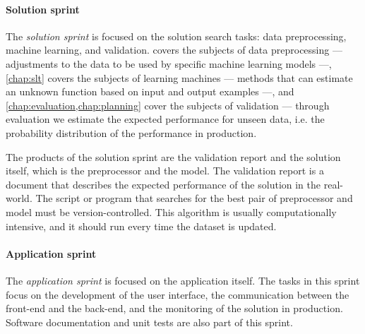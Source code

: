 \paragraph{Solution sprint}
The \emph{solution sprint} is focused on the solution search tasks: data preprocessing, machine
learning, and validation.   covers the subjects of data
preprocessing ---
adjustments to the data to be used by specific machine learning models ---, \cref{chap:slt}
covers the subjects of learning machines --- methods that can estimate an unknown function
based on input and output examples  ---, and \cref{chap:evaluation,chap:planning} cover
the subjects of validation --- through evaluation we estimate the expected performance for unseen
data, i.e. the probability distribution of the performance in production.

The products of the solution sprint are the validation report and the solution itself,
which is the preprocessor and the model.  The validation report is a document that
describes the expected performance of the solution in the real-world.  The script or
program that searches for the best pair of preprocessor and model must be
version-controlled.  This algorithm is usually computationally intensive, and it should
run every time the dataset is updated.

\paragraph{Application sprint}
The \emph{application sprint} is focused on the application itself.  The tasks in this
sprint focus on the development of the user interface, the communication between the
front-end and the back-end, and the monitoring of the solution in production.  Software
documentation and unit tests are also part of this sprint.

